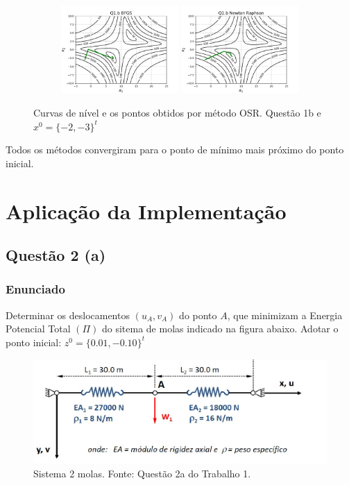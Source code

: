 \documentclass[10pt, a4paper]{article}
\begin{document}
\begin{figure}[H]
\begin{subfigure}[b]{\textwidth}
  \end{subfigure}
  \begin{subfigure}[b]{\textwidth}
    \includegraphics[width=0.49\textwidth]{figuras/Q1.b_BFGS_P0=[-2e-3].pdf}
    \includegraphics[width=0.49\textwidth]{figuras/Q1.b_Newton Raphson_P0=[-2e-3].pdf}
  \end{subfigure}
  \caption{Curvas de nível e os pontos obtidos por método OSR. Questão 1b e $x^0 = \{-2,-3\}^t$}
\end{figure}

Todos os métodos convergiram para o ponto de mínimo mais próximo do ponto inicial.

\section{Aplicação da Implementação}
\subsection{Questão 2 (a)}
\subsubsection{Enunciado}
Determinar os deslocamentos $(u_A, v_A)$ do ponto $A$, que minimizam a Energia Potencial Total $(\Pi)$ do sitema de molas
indicado na figura abaixo. Adotar o ponto inicial: $z^0 = \{0.01, -0.10\} ^t$

\begin{figure}[H]
  \centering
  \includegraphics[scale=1]{figuras/enunciado_2a.png}
  \caption{Sistema 2 molas. Fonte: Questão 2a do Trabalho 1. }
\end{figure}
\end{document}
